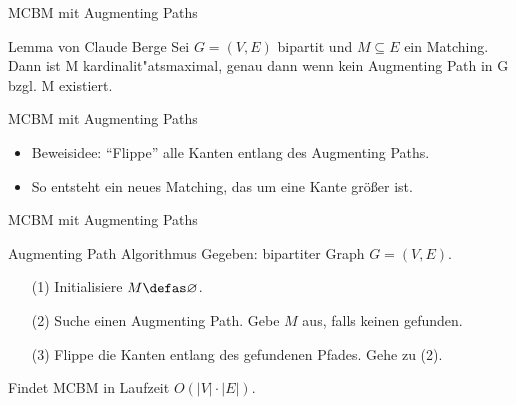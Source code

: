 \begin{frame}{MCBM mit Augmenting Paths}
\begin{block}{Lemma von Claude Berge}
Sei \(G = (V,E)\) bipartit und \(M \subseteq E\) ein Matching. \pause Dann ist M kardinalit"atsmaximal, genau dann wenn kein Augmenting Path in G bzgl. M existiert.
\end{block}
\end{frame}

\begin{frame}{MCBM mit Augmenting Paths}
\begin{itemize}
\item Beweisidee: \pause \enquote{Flippe} alle Kanten entlang des Augmenting Paths.\pause
\end{itemize}
\begin{figure}
\end{figure}
\pause\pause \begin{itemize}
\item So entsteht ein neues Matching, das um eine Kante größer ist.
\end{itemize}
\end{frame}

\begin{frame}{MCBM mit Augmenting Paths}
\begin{block}{Augmenting Path Algorithmus}
Gegeben: bipartiter Graph \(G = (V, E)\).
\begin{itemize}
\pause\item[(1)] Initialisiere \(M \defas \varnothing\).
\pause\item[(2)] Suche einen Augmenting Path. Gebe \(M\) aus, falls keinen gefunden.
\pause\item[(3)] Flippe die Kanten entlang des gefundenen Pfades. Gehe zu (2).
\end{itemize}\pause
Findet MCBM in Laufzeit \(O(|V|\cdot |E|)\).
\end{block}
\end{frame}